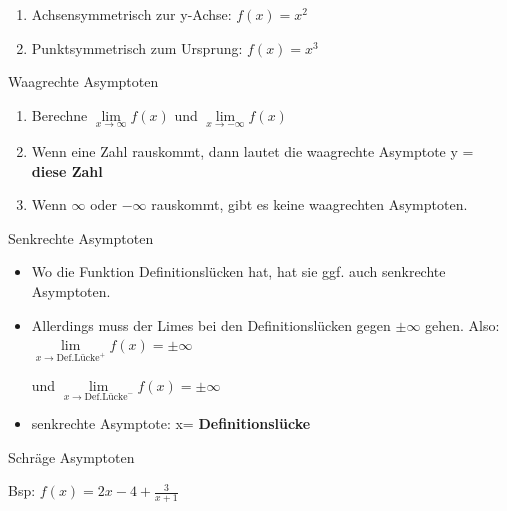 \documentclass[paper=a6,landscape,ngerman,twoside=true,fontsize=12pt]{scrartcl}
\begin{document}
\begin{antwort}
	\begin{enumerate}
		\item Achsensymmetrisch zur y-Achse: $f(x)=x^2$
		\item Punktsymmetrisch zum Ursprung: $f(x)=x^3$
	\end{enumerate}
\end{antwort}
\begin{frage}
	Waagrechte Asymptoten
\end{frage}
\begin{antwort}
	\begin{enumerate} 
		\item Berechne $\lim\limits_{x \rightarrow \infty}{f(x)}$ und $\lim\limits_{x \rightarrow -\infty}{f(x)}$	
		
		\item Wenn eine Zahl rauskommt, dann lautet die waagrechte Asymptote y = \textbf{diese Zahl}
		
		\item Wenn $\infty$ oder  $-\infty$ rauskommt, gibt es keine waagrechten Asymptoten.
			
	\end{enumerate} 
\end{antwort}
\begin{frage}
	Senkrechte Asymptoten
	
\end{frage}
\begin{antwort}
	\begin{itemize} 
		\item \large Wo die Funktion Definitionslücken hat, hat sie ggf. auch senkrechte Asymptoten.		
		
		\item Allerdings muss der Limes bei den Definitionslücken gegen  $\pm\infty$ gehen. Also: 
		 $\lim\limits_{x \rightarrow \text{Def.Lücke}^+}{f(x)}=\pm\infty$ 
		 
		 und $\lim\limits_{x \rightarrow \text{Def.Lücke}^-}{f(x)}=\pm\infty$	
	
		\item senkrechte Asymptote: x= \textbf{Definitionslücke}
		
		
	\end{itemize} 
\end{antwort}
\begin{frage}
	Schräge Asymptoten \bigskip
	
	Bsp: $f(x)=2x -4 +\frac{3}{x+1}$
\end{frage}
\end{document}
